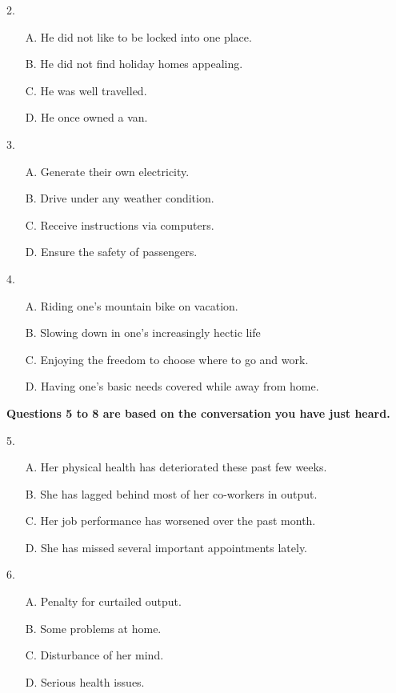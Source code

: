 \documentclass[UTF8,11pt]{ctexart}
\begin{document}
2.


\begin{itemize}[leftmargin=2em,itemsep=.2em,topsep=.4em]\item[A.] He did not like to be locked into one place.
\item[B.] He did not find holiday homes appealing.
\item[C.] He was well travelled.
\item[D.] He once owned a van.
\end{itemize}

3.


\begin{itemize}[leftmargin=2em,itemsep=.2em,topsep=.4em]\item[A.] Generate their own electricity.
\item[B.] Drive under any weather condition.
\item[C.] Receive instructions via computers.
\item[D.] Ensure the safety of passengers.
\end{itemize}

4.


\begin{itemize}[leftmargin=2em,itemsep=.2em,topsep=.4em]\item[A.] Riding one’s mountain bike on vacation.
\item[B.] Slowing down in one’s increasingly hectic life
\item[C.] Enjoying the freedom to choose where to go and work.
\item[D.] Having one’s basic needs covered while away from home.
\end{itemize}

\textbf{Questions 5 to 8 are based on the conversation you have just heard.}


5.


\begin{itemize}[leftmargin=2em,itemsep=.2em,topsep=.4em]\item[A.] Her physical health has deteriorated these past few weeks.
\item[B.] She has lagged behind most of her co-workers in output.
\item[C.] Her job performance has worsened over the past month.
\item[D.] She has missed several important appointments lately.
\end{itemize}

6.


\begin{itemize}[leftmargin=2em,itemsep=.2em,topsep=.4em]\item[A.] Penalty for curtailed output.
\item[B.] Some problems at home.
\item[C.] Disturbance of her mind.
\item[D.] Serious health issues.
\end{itemize}
\end{document}
